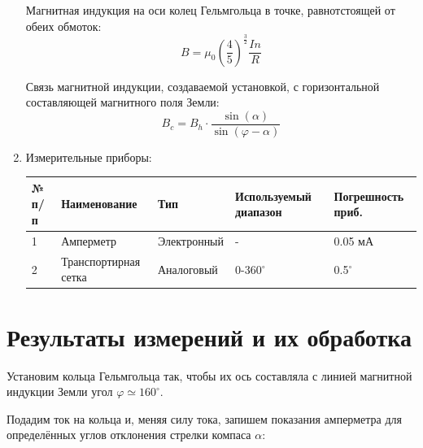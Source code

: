 \documentclass[12pt, a4paper]{article}
\begin{document}
\begin{enumerate}
Магнитная индукция на оси колец Гельмгольца в точке, равнотстоящей от обеих обмоток:
\begin{equation}
B = \mu_0 (\frac{4}{5})^{\frac{3}{2}} \frac{I n}{R}
\end{equation}

Связь магнитной индукции, создаваемой установкой, с горизонтальной составляющей магнитного поля Земли:
\begin{equation}
B_c = B_h \cdot \frac{\sin(\alpha)}{\sin(\varphi - \alpha)}
\end{equation}



\item Измерительные приборы:

\begin{table}[H]
\centering
\begin{tabular}{|l|l|l|l|l|}
\hline
№ п/п & Наименование & Тип & Используемый диапазон & Погрешность приб.\\
\hline
1 & Амперметр & Электронный & -  & 0.05 мА\\
\hline
2 & Транспортирная сетка & Аналоговый & 0-360$^{\circ}$  & 0.5$^{\circ}$\\
\hline
\end{tabular}
\end{table}

\end{enumerate}
\section{Результаты измерений и их обработка}

Установим кольца Гельмгольца так, чтобы их ось составляла с линией магнитной индукции Земли угол $\varphi \simeq 160^{\circ}$.

Подадим ток на кольца и, меняя силу тока, запишем показания амперметра для определённых углов отклонения стрелки компаса $\alpha$:
\end{document}
